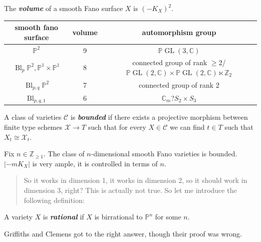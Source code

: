 \begin{definition}
\label{definition-moraga-1}
The \textit{\textbf{volume}} of a smooth Fano
surface  $X$ is $(-K_{X})^{2}$.
\end{definition}

\begin{tabular}{ccc}
smooth fano surface&volume&automorphism
group\\\hline
$\mathbb{P}^{2}$ &9&
$\mathbb{P}\operatorname{GL}(3,
\mathbb{C})$\\\hline
$\operatorname{Bl}_{p}\mathbb{P}^{2},
\mathbb{P}^{1} \times \mathbb{P}^{1}$
&8&connected group of rank $\geq
2$/$\mathbb{P}\operatorname{GL}(2,\mathbb{C})
\times
\mathbb{P}\operatorname{GL}(2,\mathbb{C})
\ltimes
\mathbb{Z}_{2}$ \\\hline
$\operatorname{Bl}_{p,q}\mathbb{P}^{2}$
&7&connected group of rank 2\\\hline
$\operatorname{Bl}_{p,q,1}$
&6&$\mathbb{C}_{m}${?}$ S_{2}\times S_{3}$
\end{tabular}

\medskip{}

\begin{definition}
\label{definition-moraga-2}
A class of varieties $\mathcal{C}$ is
\textit{\textbf{bounded}} if there exists a
projective morphism between finite type
schemes $\mathcal{X}\to T$ such that for
every $X\in \mathcal{C}$ we can find $t\in T$
such that $X_{t}\cong \mathcal{X}_{t}$.
\end{definition}

\begin{theorem}
\label{theorem-moraga-2}
Fix $n \in \mathbb{Z}_{\geq 1}$. The class of
$n$-dimensional smooth Fano varieties is
bounded. $|-mK_{X}|$ is very ample, it is
controlled in terms of $n$.
\end{theorem}

\begin{quotation}
So it works in dimension 1, it works in
dimension 2, so it should work in dimension
3, right? This is actually not true. So let
me introduce the following definition:
\end{quotation}

\begin{definition}
\label{definition-moraga-3}
A variety $X$ is \textit{\textbf{rational}}
if $ X$ is birrational to $\mathbb{P}^{n}$
for some $n$.
\end{definition}

Griffiths and Clemens got to the right
answer, though their proof was wrong.

